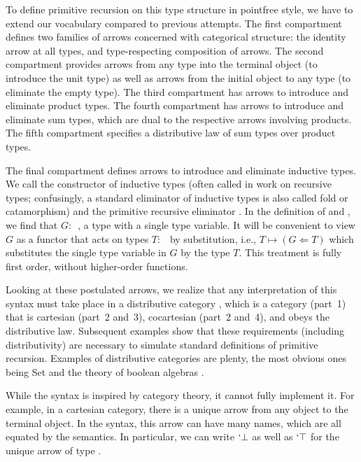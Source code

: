 \documentclass[a4paper,USenglish,cleveref, autoref, thm-restate]{lipics-v2021}
\begin{document}
To define primitive recursion on this type structure in pointfree
style, we have to extend our vocabulary compared to previous attempts.
\ccDataPR
The first compartment defines two families of arrows concerned with categorical structure: the identity arrow at all
types, and type-respecting composition of arrows.
The second compartment provides arrows from any type into the
terminal object (to introduce the unit type) as well as arrows from the
initial object to any type (to eliminate the empty type). 
The third compartment has arrows to introduce and eliminate product types.
The fourth compartment has arrows to introduce and eliminate sum types, which are dual to
the respective arrows involving products.
The fifth compartment specifies a distributive law of sum types over product types.

The final compartment
defines arrows to introduce and eliminate inductive types. We call the
constructor of inductive types  {\Afold} (often called
 in work on recursive types;
confusingly, a standard eliminator of inductive types is also called
fold or catamorphism) and the primitive recursive eliminator {\AP}.
In the definition of {\Afold} and {\AP}, we find that $G :$~, a type with a
single type variable. It will be convenient to view $G$ as a functor
that acts on types $T:$~{\ATY} by substitution, i.e., $T \mapsto (G
\Leftarrow T)$ which substitutes the single type variable in $G$ by
the type $T$.
This treatment is fully first order, without higher-order functions.

Looking at these postulated arrows, we realize that any interpretation
of this syntax must take place in a distributive category
\cite{cockett_1993}, which is a category (part~1) that is cartesian (part~2 and~3), cocartesian
(part~2 and~4), and obeys the distributive law. Subsequent examples show
that these requirements (including distributivity) are
necessary to simulate standard definitions of primitive recursion. 
Examples of distributive categories are plenty, the most obvious ones
being Set and the theory of boolean algebras \cite{cockett_1993}.

While the syntax is inspired by category theory, it cannot fully
implement it. For example, in a cartesian category, there is a unique
arrow from any object to the terminal object. In the syntax, this arrow
can have many names, which are all equated by the semantics. In
particular, we can write $`\bot$ as well as $`\top$ for the unique arrow
of type {\ccZeroOne}.
\end{document}
